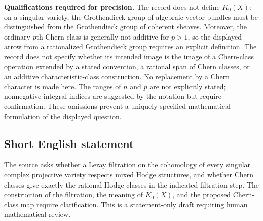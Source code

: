 \documentclass[11pt]{article}
\begin{document}
\textbf{Qualifications required for precision.} The record does not define \(K_0(X)\): on a singular variety, the Grothendieck group of algebraic vector bundles must be distinguished from the Grothendieck group of coherent sheaves. Moreover, the ordinary \(p\)th Chern class is generally not additive for \(p>1\), so the displayed arrow from a rationalized Grothendieck group requires an explicit definition. The record does not specify whether its intended image is the image of a Chern-class operation extended by a stated convention, a rational span of Chern classes, or an additive characteristic-class construction. No replacement by a Chern character is made here. The ranges of \(n\) and \(p\) are not explicitly stated; nonnegative integral indices are suggested by the notation but require confirmation. These omissions prevent a uniquely specified mathematical formulation of the displayed question.
\subsection{Short English statement}
The source asks whether a Leray filtration on the cohomology of every singular complex projective variety respects mixed Hodge structures, and whether Chern classes give exactly the rational Hodge classes in the indicated filtration step. The construction of the filtration, the meaning of \(K_0(X)\), and the proposed Chern-class map require clarification. This is a statement-only draft requiring human mathematical review.
\end{document}
